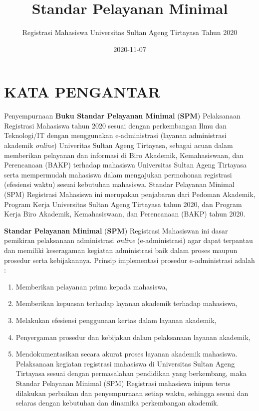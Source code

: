 \documentclass[
]{book}
\title{Standar Pelayanan Minimal}
\author{Registrasi Mahasiswa Universitas Sultan Ageng Tirtayasa Tahun 2020}
\date{2020-11-07}
\providecommand{\tightlist}{%
  \setlength{\itemsep}{0pt}\setlength{\parskip}{0pt}}
\begin{document}
\maketitle

{
\setcounter{tocdepth}{1}
\tableofcontents
}
\hypertarget{kata-pengantar}{%
\chapter*{KATA PENGANTAR}\label{kata-pengantar}}

Penyempurnaan \textbf{Buku Standar Pelayanan Minimal} (\textbf{SPM}) Pelaksanaan Registrasi Mahasiswa tahun 2020 sesuai dengan perkembangan Ilmu dan Teknologi/IT dengan menggunakan e-administrasi (layanan administrasi akademik \emph{online}) Univeritas Sultan Ageng Tirtayasa, sebagai acuan dalam memberikan pelayanan dan informasi di Biro Akademik, Kemahasiswaan, dan Perencanaan (BAKP) terhadap mahasiswa Universitas Sultan Ageng Tirtayasa serta mempermudah mahasiswa dalam mengajukan permohonan registrasi (efesiensi waktu) sesuai kebutuhan mahasiswa.
Standar Pelayanan Minimal (SPM) Registrasi Mahasiswa ini merupakan penjabaran dari Pedoman Akademik, Program Kerja Universitas Sultan Ageng Tirtayasa tahun 2020, dan Program Kerja Biro Akademik, Kemahasiswaan, dan Perencanaan (BAKP) tahun 2020.

\textbf{Standar Pelayanan Minimal} (\textbf{SPM}) Registrasi Mahasiswan ini dasar pemikiran pelaksanaan administrasi \emph{online} (e-administrasi) agar dapat terpantau dan memiliki keseragaman kegiatan administrasi baik dalam proses maupun prosedur serta kebijakannya. Prinsip implementasi prosedur e-administrasi adalah :

\begin{enumerate}
\def\labelenumi{\arabic{enumi}.}
\tightlist
\item
  Memberikan pelayanan prima kepada mahasiswa,
\item
  Memberikan kepuasan terhadap layanan akademik terhadap mahasiswa,
\item
  Melakukan efesiensi penggunaan kertas dalam layanan akademik,
\item
  Penyergaman prosedur dan kebijakan dalam pelaksanaan layanan akademik,
\item
  Mendokumentasikan secara akurat proses layanan akademik mahasiswa. Pelaksanaan kegiatan registrasi mahasiswa di Universitas Sultan Ageng Tirtayasa sesuai dengan permasalahan pendidikan yang berkembang, maka Standar Pelayanan Minimal (SPM) Registrasi mahasiswa inipun terus dilakukan perbaikan dan penyempurnaan setiap waktu, sehingga sesuai dan selaras dengan kebutuhan dan dinamika perkembangan akademik.
\end{enumerate}
\end{document}
